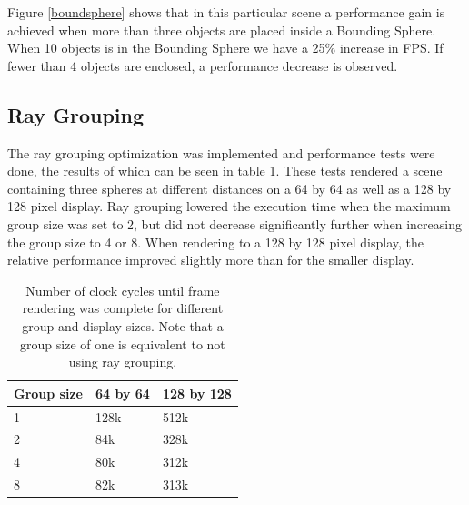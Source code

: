 			Figure \ref{boundsphere} shows that in this particular scene a
			performance gain is achieved when more than three objects are
			placed inside a Bounding Sphere.  When 10 objects is in the
			Bounding Sphere we have a 25\% increase in FPS.  If fewer than 4
			objects are enclosed, a performance decrease is observed. 
		
		\subsection{Ray Grouping}
			
			The ray grouping optimization was implemented and performance tests
			were done, the results of which can be seen in table
			\ref{grouptable}. These tests rendered a scene containing three
			spheres at different distances on a 64 by 64 as well as a 128 by 128
			pixel display. Ray grouping lowered the execution time when the
			maximum group size was set to 2, but did not decrease significantly
			further when increasing the group size to 4 or 8. When rendering to
			a 128 by 128 pixel display, the relative performance improved
			slightly more than for the smaller display.

			\begin{table}[T]
			\centering
			\begin{tabular}{lll}
				\hline
				Group size & 64 by 64 & 128 by 128 \\
				\hline
				1          & 128k     &  512k      \\
				2          & 84k      &  328k      \\
				4          & 80k      &  312k      \\
				8          & 82k      &  313k      \\
				\hline
			\end{tabular}
			\caption{Number of clock cycles until frame rendering was complete
				for different group and display sizes. Note that a group size 
				of one is equivalent to not using ray grouping.}
			\label{grouptable}
			\end{table}

